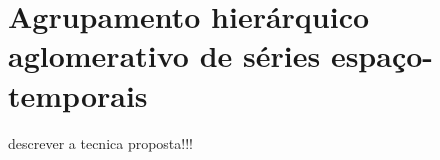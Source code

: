 \section{Agrupamento hierárquico aglomerativo de séries espaço-temporais}

descrever a tecnica proposta!!!